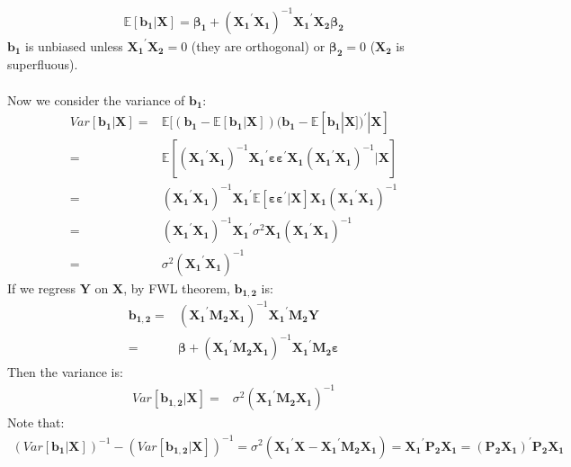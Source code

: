 \documentclass{article}
\begin{document}
	\begin{align*}
		\mathbb{E} [\boldsymbol{b_1} | \boldsymbol{X}] = \boldsymbol{\beta_1} + (\boldsymbol{X_1}^\prime \boldsymbol{X_1})^{-1} \boldsymbol{X_1}^\prime \boldsymbol{X_2} \boldsymbol{\beta_2}
	\end{align*}
$\boldsymbol{b_1}$ is unbiased unless $\boldsymbol{X_1}^\prime \boldsymbol{X_2} = 0$ (they are orthogonal) or $\boldsymbol{\beta_2} = 0$ ($\boldsymbol{X_2}$ is superfluous).\\\\
Now we consider the variance of $\boldsymbol{b_1}$:
	\begin{align*}
		Var[\boldsymbol{b_1} | \boldsymbol{X}] = &\mathbb{E}[(\boldsymbol{b_1} - \mathbb{E}[\boldsymbol{b_1} | \boldsymbol{X}]) (\boldsymbol{b_1} - \mathbb{E}[\boldsymbol{b_1} | \boldsymbol{X}])^\prime | \boldsymbol{X}]\\ = &
		\mathbb{E}[(\boldsymbol{X_1}^\prime \boldsymbol{X_1})^{-1} \boldsymbol{X_1}^\prime \boldsymbol{\varepsilon} \boldsymbol{\varepsilon}^\prime \boldsymbol{X_1} (\boldsymbol{X_1}^\prime \boldsymbol{X_1})^{-1} | \boldsymbol{X}]\\ = &
		(\boldsymbol{X_1}^\prime \boldsymbol{X_1})^{-1} \boldsymbol{X_1}^\prime \mathbb{E}[\boldsymbol{\varepsilon} \boldsymbol{\varepsilon}^\prime | \boldsymbol{X}] \boldsymbol{X_1} (\boldsymbol{X_1}^\prime \boldsymbol{X_1})^{-1}\\ = &
		(\boldsymbol{X_1}^\prime \boldsymbol{X_1})^{-1} \boldsymbol{X_1}^\prime \sigma^2 \boldsymbol{X_1} (\boldsymbol{X_1}^\prime \boldsymbol{X_1})^{-1}\\ = &
		\sigma^2 (\boldsymbol{X_1}^\prime \boldsymbol{X_1})^{-1}
	\end{align*}
If we regress $\boldsymbol{Y}$ on $\boldsymbol{X}$, by FWL theorem, $\boldsymbol{b_{1,2}}$ is:
	\begin{align*}
		\boldsymbol{b_{1,2}} = &(\boldsymbol{X_1}^\prime \boldsymbol{M_2} \boldsymbol{X_1})^{-1} \boldsymbol{X_1}^\prime \boldsymbol{M_2} \boldsymbol{Y}\\ = &
		\boldsymbol{\beta} + (\boldsymbol{X_1}^\prime \boldsymbol{M_2} \boldsymbol{X_1})^{-1} \boldsymbol{X_1}^\prime \boldsymbol{M_2} \boldsymbol{\varepsilon} 
	\end{align*}
Then the variance is:
	\begin{align*}
		Var[\boldsymbol{b_{1,2}} | \boldsymbol{X}] = & \sigma^2 (\boldsymbol{X_1}^\prime \boldsymbol{M_2} \boldsymbol{X_1})^{-1}
	\end{align*}
Note that:
	\begin{align*}
		(Var[\boldsymbol{b_1} | \boldsymbol{X}])^{-1} - (Var[\boldsymbol{b_{1, 2}} | \boldsymbol{X}])^{-1} = \sigma^2 (\boldsymbol{X_1}^\prime \boldsymbol{X} - \boldsymbol{X_1}^\prime \boldsymbol{M_2} \boldsymbol{X_1}) = \boldsymbol{X_1}^\prime \boldsymbol{P_2} \boldsymbol{X_1} = (\boldsymbol{P_2} \boldsymbol{X_1})^\prime \boldsymbol{P_2} \boldsymbol{X_1}
	\end{align*}
\end{document}
